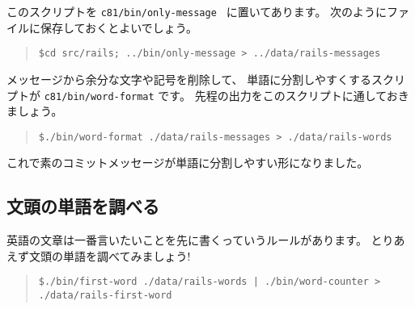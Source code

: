 \documentclass{jarticle}
\begin{document}
このスクリプトを {\tt c81/bin/only-message } に置いてあります。
次のようにファイルに保存しておくとよいでしょう。
\begin{quote}
{\tt \$cd src/rails; ../bin/only-message > ../data/rails-messages }
\end{quote}

メッセージから余分な文字や記号を削除して、
単語に分割しやすくするスクリプトが {\tt c81/bin/word-format} です。
先程の出力をこのスクリプトに通しておきましょう。
\begin{quote}
{\tt \$./bin/word-format ./data/rails-messages > ./data/rails-words }
\end{quote}

これで素のコミットメッセージが単語に分割しやすい形になりました。


  \subsection{文頭の単語を調べる}
  英語の文章は一番言いたいことを先に書くっていうルールがあります。
  とりあえず文頭の単語を調べてみましょう!
  \begin{quote}
   {\tt \$./bin/first-word ./data/rails-words | ./bin/word-counter > ./data/rails-first-word}
  \end{quote}
\end{document}

